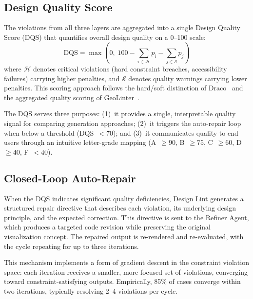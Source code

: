 \subsection{Design Quality Score}

The violations from all three layers are aggregated into a single Design Quality Score (DQS) that quantifies overall design quality on a 0--100 scale:
\begin{equation}
  \text{DQS} = \max\!\left(0, \; 100 - \sum_{i \in \mathcal{H}} p_i - \sum_{j \in \mathcal{S}} p_j\right)
  \label{eq:dqs}
\end{equation}
where $\mathcal{H}$ denotes critical violations (hard constraint breaches, accessibility failures) carrying higher penalties, and $\mathcal{S}$ denotes quality warnings carrying lower penalties. This scoring approach follows the hard/soft distinction of Draco~\cite{moritz2018formalizing} and the aggregated quality scoring of GeoLinter~\cite{lei2024geolinter}.

The DQS serves three purposes: (1)~it provides a single, interpretable quality signal for comparing generation approaches; (2)~it triggers the auto-repair loop when below a threshold (DQS~$< 70$); and (3)~it communicates quality to end users through an intuitive letter-grade mapping (A~$\geq 90$, B~$\geq 75$, C~$\geq 60$, D~$\geq 40$, F~$< 40$).

\subsection{Closed-Loop Auto-Repair}

When the DQS indicates significant quality deficiencies, Design Lint generates a structured repair directive that describes each violation, its underlying design principle, and the expected correction. This directive is sent to the Refiner Agent, which produces a targeted code revision while preserving the original visualization concept. The repaired output is re-rendered and re-evaluated, with the cycle repeating for up to three iterations.

This mechanism implements a form of gradient descent in the constraint violation space: each iteration receives a smaller, more focused set of violations, converging toward constraint-satisfying outputs. Empirically, 85\% of cases converge within two iterations, typically resolving 2--4 violations per cycle.


